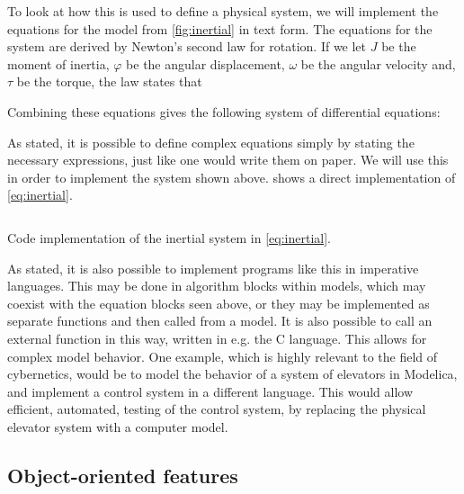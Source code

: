 \documentclass[\rootfolder/main.tex]{subfiles}
\begin{document}
\inputminted[fontsize=\footnotesize]{Modelica}{\rootfolder/Chapters/Chapter2/Listings/simultaneous.txt}

To look at how this is used to define a physical system, we will implement the equations for the model from \cref{fig:inertial} in text form.
The equations for the system are derived by Newton's second law for rotation.
If we let $J$ be the moment of inertia, $\varphi$ be the angular displacement, $\omega$ be the angular velocity and, $\tau$ be the torque, the law states that


Combining these equations gives the following system of differential equations:


As stated, it is possible to define complex equations simply by stating the necessary expressions, just like one would write them on paper.
We will use this in order to implement the system shown above.
 shows a direct implementation of \cref{eq:inertial}.

\begin{listing}[ht]
    \inputminted[fontsize=\footnotesize]{Modelica}{\rootfolder/Models/MasterProject/Models/InertialCode.mo}
    \caption{Code implementation of the inertial system in \cref{eq:inertial}.\label{lst:inertial-code}}
\end{listing}

As stated, it is also possible to implement programs like this in imperative languages.
This may be done in algorithm blocks within models, which may coexist with the equation blocks seen above, or they may be implemented as separate functions and then called from a model.
It is also possible to call an external function in this way, written in e.g. the C language.
This allows for complex model behavior.
One example, which is highly relevant to the field of cybernetics, would be to model the behavior of a system of elevators in Modelica, and implement a control system in a different language.
This would allow efficient, automated, testing of the control system, by replacing the physical elevator system with a computer model.

\subsection{Object-oriented features}
\end{document}
